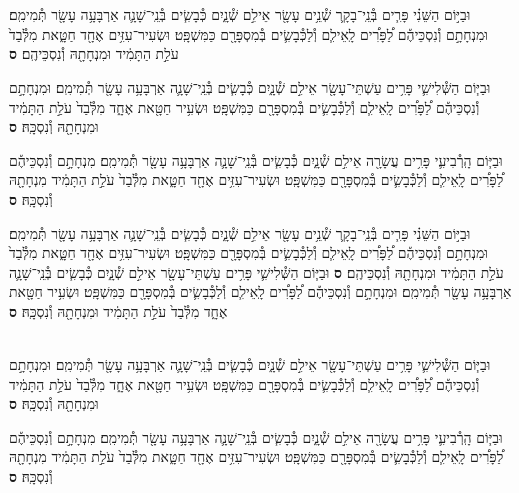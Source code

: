\documentclass[twoside, openany, parskip=half, 11pt]{book}
\begin{document}
\begin{footnotesize}
\begin{multicols}{2}

\\
\\
וּבַיּ֣וֹם הַשֵּׁנִ֗י פָּרִ֧ים בְּ֯נֵֽי־בָקָ֛ר שְׁ֯נֵ֥ים עָשָׂ֖ר אֵילִ֣ם שְׁ֯נָ֑יִם כְּ֯בָשִׂ֧ים בְּ֯נֵֽי־שָׁנָ֛ה אַרְבָּעָ֥ה עָשָׂ֖ר תְּ֯מִימִֽם׃ וּמִנְחָתָ֣ם וְ֯נִסְכֵּיהֶ֡ם לַ֠פָּרִ֠ים לָֽאֵילִ֧ם וְ֯לַכְּ֯בָשִׂ֛ים בְּ֯מִסְפָּרָ֖ם כַּמִּשְׁפָּֽט׃ וּשְׂעִיר־עִזִּ֥ים אֶחָ֖ד חַטָּ֑את מִלְּ֯בַד֙ עֹלַ֣ת הַתָּמִ֔יד וּמִנְחָתָ֖הּ וְ֯נִסְכֵּיהֶֽם׃ \textbf{ס}

וּבַיּ֧וֹם הַשְּׁ֯לִישִׁ֛י פָּרִ֥ים עַשְׁתֵּי־עָשָׂ֖ר אֵילִ֣ם שְׁ֯נָ֑יִם כְּ֯בָשִׂ֧ים בְּ֯נֵֽי־שָׁנָ֛ה אַרְבָּעָ֥ה עָשָׂ֖ר תְּ֯מִימִֽם׃ וּמִנְחָתָ֣ם וְ֯נִסְכֵּיהֶ֡ם לַ֠פָּרִ֠ים לָֽאֵילִ֧ם וְ֯לַכְּ֯בָשִׂ֛ים בְּ֯מִסְפָּרָ֖ם כַּמִּשְׁפָּֽט׃ וּשְׂעִ֥יר חַטָּ֖את אֶחָ֑ד מִלְּ֯בַד֙ עֹלַ֣ת הַתָּמִ֔יד וּמִנְחָתָ֖הּ וְ֯נִסְכָּֽהּ׃ \textbf{ס}

וּבַיּ֧וֹם הָֽרְ֯בִיעִ֛י פָּרִ֥ים עֲשָׂרָ֖ה אֵילִ֣ם שְׁ֯נָ֑יִם כְּ֯בָשִׂ֧ים בְּ֯נֵֽי־שָׁנָ֛ה אַרְבָּעָ֥ה עָשָׂ֖ר תְּ֯מִימִֽם׃ מִנְחָתָ֣ם וְ֯נִסְכֵּיהֶ֡ם לַ֠פָּרִ֠ים לָֽאֵילִ֧ם וְ֯לַכְּ֯בָשִׂ֛ים בְּ֯מִסְפָּרָ֖ם כַּמִּשְׁפָּֽט׃ וּשְׂעִיר־עִזִּ֥ים אֶחָ֖ד חַטָּ֑את מִלְּ֯בַד֙ עֹלַ֣ת הַתָּמִ֔יד מִנְחָתָ֖הּ וְ֯נִסְכָּֽהּ׃ \textbf{ס}

וּבַיּ֣וֹם הַשֵּׁנִ֗י פָּרִ֧ים בְּ֯נֵֽי־בָקָ֛ר שְׁ֯נֵ֥ים עָשָׂ֖ר אֵילִ֣ם שְׁ֯נָ֑יִם כְּ֯בָשִׂ֧ים בְּ֯נֵֽי־שָׁנָ֛ה אַרְבָּעָ֥ה עָשָׂ֖ר תְּ֯מִימִֽם׃ וּמִנְחָתָ֣ם וְ֯נִסְכֵּיהֶ֡ם לַ֠פָּרִ֠ים לָֽאֵילִ֧ם וְ֯לַכְּ֯בָשִׂ֛ים בְּ֯מִסְפָּרָ֖ם כַּמִּשְׁפָּֽט׃ וּשְׂעִיר־עִזִּ֥ים אֶחָ֖ד חַטָּ֑את מִלְּ֯בַד֙ עֹלַ֣ת הַתָּמִ֔יד וּמִנְחָתָ֖הּ וְ֯נִסְכֵּיהֶֽם׃ \textbf{ס}
וּבַיּ֧וֹם הַשְּׁ֯לִישִׁ֛י פָּרִ֥ים עַשְׁתֵּי־עָשָׂ֖ר אֵילִ֣ם שְׁ֯נָ֑יִם כְּ֯בָשִׂ֧ים בְּ֯נֵֽי־שָׁנָ֛ה אַרְבָּעָ֥ה עָשָׂ֖ר תְּ֯מִימִֽם׃ וּמִנְחָתָ֣ם וְ֯נִסְכֵּיהֶ֡ם לַ֠פָּרִ֠ים לָֽאֵילִ֧ם וְ֯לַכְּ֯בָשִׂ֛ים בְּ֯מִסְפָּרָ֖ם כַּמִּשְׁפָּֽט׃ וּשְׂעִ֥יר חַטָּ֖את אֶחָ֑ד מִלְּ֯בַד֙ עֹלַ֣ת הַתָּמִ֔יד וּמִנְחָתָ֖הּ וְ֯נִסְכָּֽהּ׃ \textbf{ס}

\\
וּבַיּ֧וֹם הַשְּׁ֯לִישִׁ֛י פָּרִ֥ים עַשְׁתֵּי־עָשָׂ֖ר אֵילִ֣ם שְׁ֯נָ֑יִם כְּ֯בָשִׂ֧ים בְּ֯נֵֽי־שָׁנָ֛ה אַרְבָּעָ֥ה עָשָׂ֖ר תְּ֯מִימִֽם׃ וּמִנְחָתָ֣ם וְ֯נִסְכֵּיהֶ֡ם לַ֠פָּרִ֠ים לָֽאֵילִ֧ם וְ֯לַכְּ֯בָשִׂ֛ים בְּ֯מִסְפָּרָ֖ם כַּמִּשְׁפָּֽט׃ וּשְׂעִ֥יר חַטָּ֖את אֶחָ֑ד מִלְּ֯בַד֙ עֹלַ֣ת הַתָּמִ֔יד וּמִנְחָתָ֖הּ וְ֯נִסְכָּֽהּ׃ \textbf{ס}

וּבַיּ֧וֹם הָֽרְ֯בִיעִ֛י פָּרִ֥ים עֲשָׂרָ֖ה אֵילִ֣ם שְׁ֯נָ֑יִם כְּ֯בָשִׂ֧ים בְּ֯נֵֽי־שָׁנָ֛ה אַרְבָּעָ֥ה עָשָׂ֖ר תְּ֯מִימִֽם׃ מִנְחָתָ֣ם וְ֯נִסְכֵּיהֶ֡ם לַ֠פָּרִ֠ים לָֽאֵילִ֧ם וְ֯לַכְּ֯בָשִׂ֛ים בְּ֯מִסְפָּרָ֖ם כַּמִּשְׁפָּֽט׃ וּשְׂעִיר־עִזִּ֥ים אֶחָ֖ד חַטָּ֑את מִלְּ֯בַד֙ עֹלַ֣ת הַתָּמִ֔יד מִנְחָתָ֖הּ וְ֯נִסְכָּֽהּ׃ \textbf{ס}


\end{multicols}
\end{footnotesize}
\end{document}
